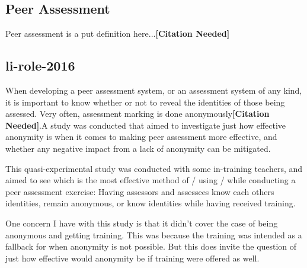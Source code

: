 \documentclass[a4paper,11pt]{report}
\newcommand{\cn}{\textbf{[Citation Needed]}}
\begin{document}
\subsection{Peer Assessment}
Peer assessment is a put definition here...\cn

\subsection{li-role-2016}
When developing a peer assessment system, or an assessment system of any kind, it is important to know whether or not to reveal the identities of those being assessed. Very often, assessment marking is done anonymously\cn.A study was conducted\cite{li_role_2016} that aimed to investigate just how effective anonymity is when it comes to making peer assessment more effective, and whether any negative impact from a lack of anonymity can be mitigated.\par
This quasi-experimental study was conducted with some in-training teachers, and aimed to see which is the most effective method of / using / while conducting a peer assessment exercise: Having assessors and assessees know each others identities, remain anonymous, or know identities while having received training.\par
One concern I have with this study is that it didn't cover the case of being anonymous and getting training. This was because the training was intended as a fallback for when anonymity is not possible. But this does invite the question of just how effective would anonymity be if training were offered as well.\par
\end{document}
